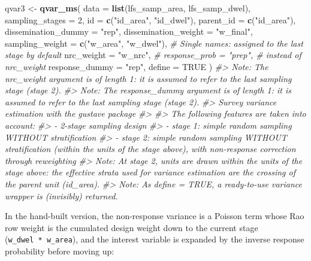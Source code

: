 \documentclass[
]{article}
\newenvironment{Shaded}{\begin{snugshade}}{\end{snugshade}}
\newcommand{\AttributeTok}[1]{\textcolor[rgb]{0.13,0.29,0.53}{#1}}
\newcommand{\CommentTok}[1]{\textcolor[rgb]{0.56,0.35,0.01}{\textit{#1}}}
\newcommand{\ConstantTok}[1]{\textcolor[rgb]{0.56,0.35,0.01}{#1}}
\newcommand{\DecValTok}[1]{\textcolor[rgb]{0.00,0.00,0.81}{#1}}
\newcommand{\FunctionTok}[1]{\textcolor[rgb]{0.13,0.29,0.53}{\textbf{#1}}}
\newcommand{\NormalTok}[1]{#1}
\newcommand{\OtherTok}[1]{\textcolor[rgb]{0.56,0.35,0.01}{#1}}
\newcommand{\StringTok}[1]{\textcolor[rgb]{0.31,0.60,0.02}{#1}}
\begin{document}
\begin{Shaded}
\begin{Highlighting}[]
\NormalTok{qvar3 }\OtherTok{\textless{}{-}} \FunctionTok{qvar\_ms}\NormalTok{(}
  \AttributeTok{data =} \FunctionTok{list}\NormalTok{(lfs\_samp\_area, lfs\_samp\_dwel),}
  \AttributeTok{sampling\_stages =} \DecValTok{2}\NormalTok{,}
  \AttributeTok{id =} \FunctionTok{c}\NormalTok{(}\StringTok{"id\_area"}\NormalTok{, }\StringTok{"id\_dwel"}\NormalTok{),}
  \AttributeTok{parent\_id =} \FunctionTok{c}\NormalTok{(}\StringTok{"id\_area"}\NormalTok{),}
  \AttributeTok{dissemination\_dummy =} \StringTok{"rep"}\NormalTok{,}
  \AttributeTok{dissemination\_weight =} \StringTok{"w\_final"}\NormalTok{,}
  \AttributeTok{sampling\_weight =} \FunctionTok{c}\NormalTok{(}\StringTok{"w\_area"}\NormalTok{, }\StringTok{"w\_dwel"}\NormalTok{),}
  \CommentTok{\# Single names: assigned to the last stage by default}
  \AttributeTok{nrc\_weight =} \StringTok{"w\_nrc"}\NormalTok{,}
  \CommentTok{\# response\_prob = "prep", \# instead of nrc\_weight}
  \AttributeTok{response\_dummy =} \StringTok{"rep"}\NormalTok{,}
  \AttributeTok{define =} \ConstantTok{TRUE}
\NormalTok{)}
\CommentTok{\#\textgreater{} Note: The nrc\_weight argument is of length 1: it is assumed to refer to the last sampling stage (stage 2).}
\CommentTok{\#\textgreater{} Note: The response\_dummy argument is of length 1: it is assumed to refer to the last sampling stage (stage 2).}
\CommentTok{\#\textgreater{} Survey variance estimation with the gustave package}
\CommentTok{\#\textgreater{} }
\CommentTok{\#\textgreater{} The following features are taken into account:}
\CommentTok{\#\textgreater{}   {-} 2{-}stage sampling design}
\CommentTok{\#\textgreater{}   {-} stage 1: simple random sampling WITHOUT stratification}
\CommentTok{\#\textgreater{}   {-} stage 2: simple random sampling WITHOUT stratification (within the units of the stage above), with non{-}response correction through reweighting}
\CommentTok{\#\textgreater{} Note: At stage 2, units are drawn within the units of the stage above: the effective strata used for variance estimation are the crossing of the parent unit (id\_area).}
\CommentTok{\#\textgreater{} Note: As define = TRUE, a ready{-}to{-}use variance wrapper is (invisibly) returned.}
\end{Highlighting}
\end{Shaded}

In the hand-built version, the non-response variance is a Poisson term
whose Rao row weight is the cumulated design weight down to the current
stage (\texttt{w\_dwel\ *\ w\_area}), and the interest variable is
expanded by the inverse response probability before moving up:
\end{document}
